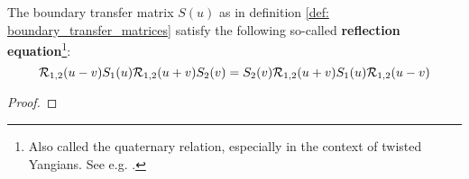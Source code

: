         \begin{definition} \label{def: boundary_transfer_matrices}
            
        \end{definition}
        \begin{lemma} \label{lemma: reflection_equations}
            The boundary transfer matrix $S(u)$ as in definition \ref{def: boundary_transfer_matrices} satisfy the following so-called \textbf{reflection equation}\footnote{Also called the quaternary relation, especially in the context of twisted Yangians. See e.g. \cite[Proposition 2.2.1]{molev_yangians_and_classical_lie_algebras}.}:
                \begin{equation} \label{equation: reflection_equations}
                    \mathcal{R}_{1, 2}(u - v) S_1(u) \mathcal{R}_{1, 2}(u + v) S_2(v) = S_2(v) \mathcal{R}_{1, 2}(u + v) S_1(u) \mathcal{R}_{1, 2}(u - v) 
                \end{equation}
        \end{lemma}
            \begin{proof}
                
            \end{proof}
    
        \begin{definition} \label{def: (extended)_twisted_yangians}
            
        \end{definition}


